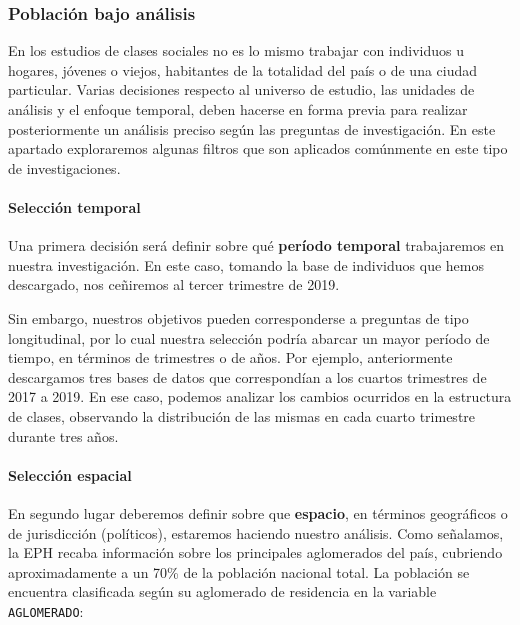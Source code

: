 \documentclass[
]{article}
\begin{document}
\hypertarget{poblaciuxf3n-bajo-anuxe1lisis}{%
\subsubsection{Población bajo análisis}\label{poblaciuxf3n-bajo-anuxe1lisis}}

En los estudios de clases sociales no es lo mismo trabajar con individuos u hogares, jóvenes o viejos, habitantes de la totalidad del país o de una ciudad particular. Varias decisiones respecto al universo de estudio, las unidades de análisis y el enfoque temporal, deben hacerse en forma previa para realizar posteriormente un análisis preciso según las preguntas de investigación. En este apartado exploraremos algunas filtros que son aplicados comúnmente en este tipo de investigaciones.

\hypertarget{selecciuxf3n-temporal}{%
\paragraph{Selección temporal}\label{selecciuxf3n-temporal}}

Una primera decisión será definir sobre qué \textbf{período temporal} trabajaremos en nuestra investigación. En este caso, tomando la base de individuos que hemos descargado, nos ceñiremos al tercer trimestre de 2019.

Sin embargo, nuestros objetivos pueden corresponderse a preguntas de tipo longitudinal, por lo cual nuestra selección podría abarcar un mayor período de tiempo, en términos de trimestres o de años. Por ejemplo, anteriormente descargamos tres bases de datos que correspondían a los cuartos trimestres de 2017 a 2019. En ese caso, podemos analizar los cambios ocurridos en la estructura de clases, observando la distribución de las mismas en cada cuarto trimestre durante tres años.

\hypertarget{selecciuxf3n-espacial}{%
\paragraph{Selección espacial}\label{selecciuxf3n-espacial}}

En segundo lugar deberemos definir sobre que \textbf{espacio}, en términos geográficos o de jurisdicción (políticos), estaremos haciendo nuestro análisis. Como señalamos, la EPH recaba información sobre los principales aglomerados del país, cubriendo aproximadamente a un 70\% de la población nacional total. La población se encuentra clasificada según su aglomerado de residencia en la variable \texttt{AGLOMERADO}:
\end{document}
